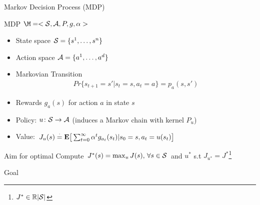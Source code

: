 \documentclass[10pt,handout]{beamer}
\begin{document}
\begin{frame}[fragile]{Markov Decision Process (MDP)}
\begin{block}{MDP $\M=<\S,\A,P,g,\alpha>$}
\begin{itemize}
\item State space $\S=\{s^1,\ldots,s^n\}$
\item Action space $\A=\{a^1,\ldots,a^d\}$
\item Markovian Transition
\begin{align*}
Pr\{s_{t+1}=s'| s_t=s, a_t=a\}=p_a(s,s')
\end{align*}
\item Rewards $g_a(s)$ for action $a$ in state $s$
\item Policy: $u\colon \S\ra \A$ (induces a Markov chain with kernel $P_u$)
\item Value: $J_u(s)\eqdef \E\big[\sum_{t=0}^\infty \alpha^t g_{a_t}(s_t)|s_0=s,a_t=u(s_t)\big]$
\end{itemize}
\end{block}
\begin{block}{Aim for optimal}
Compute  $J^*(s)=\max_{u} J(s),\,\forall s\in \S$ and $u^*$ s.t $J_{u^*}=J^*$\footnote{$J^*\in \R{|\S|}$}
\end{block}
\end{frame}


\begin{frame}[fragile]{Goal}
\begin{algorithm}[H]
\begin{algorithmic}[1]
\STATE{$\vdots$}
\STATE{\}}
\end{algorithmic}

\end{algorithm}

\end{frame}
\end{document}
